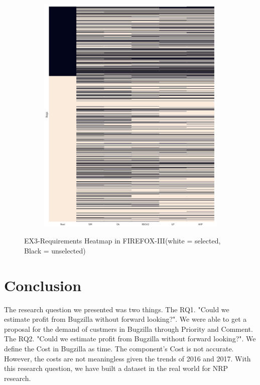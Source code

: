 \begin{figure}[h]
\centering
  \begin{subfigure}[b]{0.95\linewidth}
    \includegraphics[width=\linewidth]{images/heatmap_ff3.png}
  \end{subfigure}
  \caption{EX3-Requirements Heatmap in FIREFOX-III(white = selected, Black = unselected)}
  \label{fig:FirefoxIIIHeatmap}
\end{figure}
\section{Conclusion}
The research question we presented was two things.
The RQ1. "Could we estimate profit from Bugzilla without forward looking?". We were able to get a proposal for the demand of custmers in Bugzilla through Priority and Comment. The RQ2. "Could we estimate profit from Bugzilla without forward looking?". We define the Cost in Bugzilla as time. The component's Cost is not accurate. However, the costs are not meaningless given the trends of 2016 and 2017. With this research question, we have built a dataset in the real world for NRP research.

